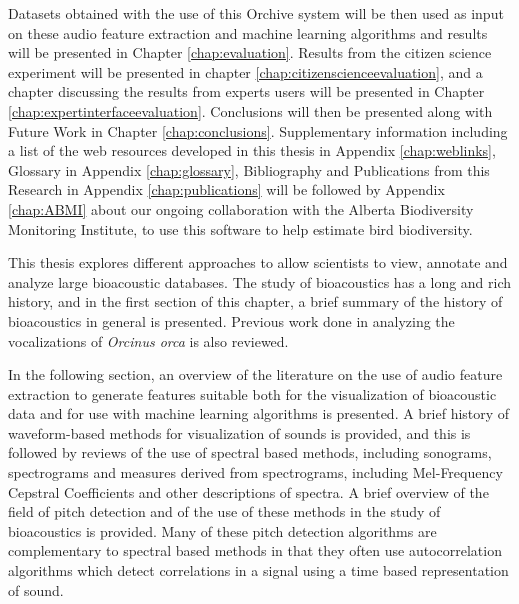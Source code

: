 \documentclass[12pt,oneside]{book}
\begin{document}
Datasets obtained with the use of this Orchive system will be then
used as input on these audio feature extraction and machine learning
algorithms and results will be presented in Chapter
\ref{chap:evaluation}.  Results from the citizen science experiment
will be presented in chapter \ref{chap:citizenscienceevaluation}, and
a chapter discussing the results from experts users will be presented
in Chapter \ref{chap:expertinterfaceevaluation}.  Conclusions will
then be presented along with Future Work in Chapter
\ref{chap:conclusions}.  Supplementary information including a list of
the web resources developed in this thesis in Appendix
\ref{chap:weblinks}, Glossary in Appendix \ref{chap:glossary},
Bibliography and Publications from this Research in Appendix
\ref{chap:publications} will be followed by Appendix \ref{chap:ABMI}
about our ongoing collaboration with the Alberta Biodiversity
Monitoring Institute, to use this software to help estimate bird
biodiversity.



\label{chap:relatedWork}

This thesis explores different approaches to allow scientists to view,
annotate and analyze large bioacoustic databases.  The study of
bioacoustics has a long and rich history, and in the first section of
this chapter, a brief summary of the history of bioacoustics in
general is presented.  Previous work done in analyzing the
vocalizations of \textit{Orcinus orca} is also reviewed.

In the following section, an overview of the literature on the use of
audio feature extraction to generate features suitable both for the
visualization of bioacoustic data and for use with machine learning
algorithms is presented.  A brief history of waveform-based
methods for visualization of sounds is provided, and this is
followed by reviews of the use of spectral based methods, including
sonograms, spectrograms and measures derived from spectrograms,
including Mel-Frequency Cepstral Coefficients and other descriptions
of spectra.  A brief overview of the field of pitch detection and of
the use of these methods in the study of bioacoustics is
provided.  Many of these pitch detection algorithms are complementary
to spectral based methods in that they often use autocorrelation
algorithms which detect correlations in a signal using a time based
representation of sound.
\end{document}
